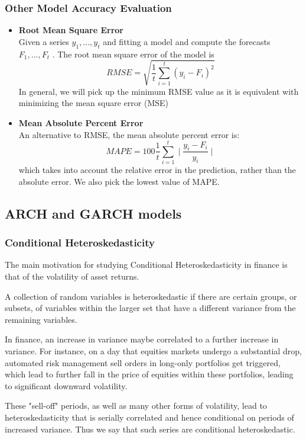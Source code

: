 		\subsubsection {Other Model Accuracy Evaluation}
        \begin{itemize}
          \item  \textbf{Root Mean Square Error} \\
Given a series $y_1 , . . . , y_t$ and fitting a model and compute the forecasts $F_1 , . . . , F_t$ . The root mean square error of the model is
$$ RMSE = \sqrt{\frac{1}{t}\displaystyle\sum_{i=1}^{t}(y_i-F_i)^2} $$
In general, we will pick up the minimum RMSE value as it is equivalent with minimizing the mean square error (MSE)

          \item  \textbf{Mean Absolute Percent Error} \\
An alternative to RMSE, the mean absolute percent error is:
$$ MAPE = 100\frac{1}{t}\displaystyle\sum_{i=1}^{t}\mid \frac{y_i-F_i}{y_i}\mid $$
which takes into account the relative error in the prediction, rather than the absolute error. We also pick the lowest value of MAPE.
        \end{itemize}

\subsection {ARCH and GARCH models}
		\subsubsection {Conditional Heteroskedasticity}
        
The main motivation for studying Conditional Heteroskedasticity in finance is that of the volatility of asset returns.

A collection of random variables is heteroskedastic if there are certain groups, or subsets, of variables within the larger set that have a different variance from the remaining variables.

In finance, an increase in variance maybe correlated to a further increase in variance. For instance, on a day that equities markets undergo a substantial drop, automated risk management sell orders in long-only portfolios get triggered, which lead to further fall in the price of equities within these portfolios, leading to significant downward volatility.

These "sell-off" periods, as well as many other forms of volatility, lead to heteroskedasticity that is serially correlated and hence conditional on periods of increased variance. Thus we say that such series are conditional heteroskedastic.

